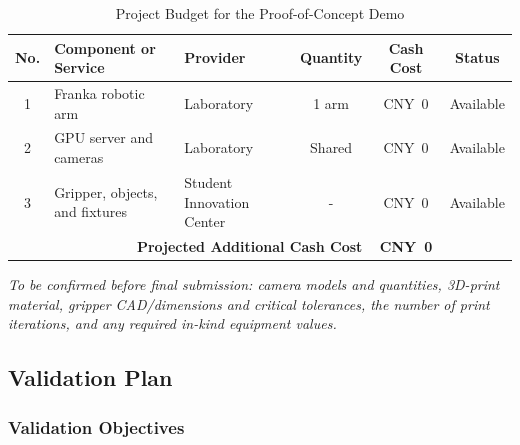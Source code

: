 \documentclass[12pt, letterpaper]{article}
\begin{document}
\begin{table}[H]
\centering
\caption{Project Budget for the Proof-of-Concept Demo}
\label{tab:budget}
\footnotesize
\setlength{\tabcolsep}{4pt}
\begin{tabularx}{\textwidth}{cXXccc}
\toprule
\textbf{No.} & \textbf{Component or Service} & \textbf{Provider} &
\textbf{Quantity} & \textbf{Cash Cost} & \textbf{Status} \\
\midrule
1 & Franka robotic arm & Laboratory & 1 arm & CNY~0 & Available \\
2 & GPU server and cameras & Laboratory & Shared & CNY~0 & Available \\
3 & Gripper, objects, and fixtures & Student Innovation Center & - & CNY~0 & Available \\
\midrule
\multicolumn{4}{r}{\textbf{Projected Additional Cash Cost}} & \textbf{CNY~0} & \\
\bottomrule
\end{tabularx}
\end{table}

\noindent\textit{To be confirmed before final submission: camera models and
quantities, 3D-print material, gripper CAD/dimensions and critical tolerances,
the number of print iterations, and any required in-kind equipment values.}


%
%

\begingroup
\setlength{\parskip}{2pt}

\subsection{Validation Plan}
\footnotesize

\subsubsection{Validation Objectives}
\end{document}
